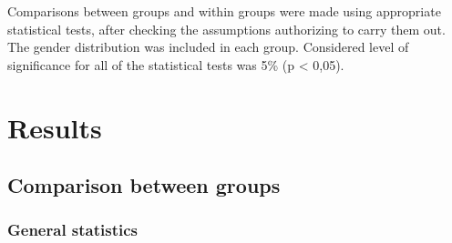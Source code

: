 \documentclass[12pt,a4paper,notitlepage]{report}
\begin{document}
Comparisons between groups and within groups were made using appropriate statistical tests, after checking the assumptions authorizing to carry them out.
The gender distribution was included in each group. Considered level of significance for all of the statistical tests was 5\% (p < 0,05).



\chapter{Results}
\section{Comparison between groups}

\subsection{General statistics} 
\noindent
\end{document}
